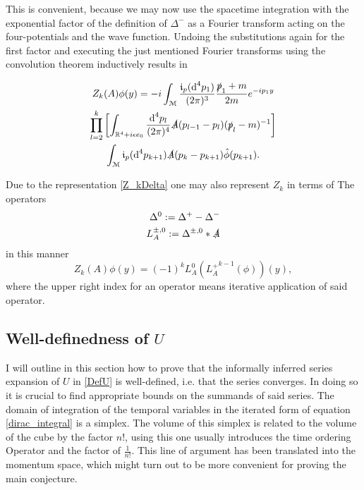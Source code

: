 \documentclass[b5paper,draft,openbib,12pt]{memoir}
\begin{document}
 This is convenient, because we may now use the spacetime
integration with the exponential factor of the definition of \(\Delta^-\) as a Fourier transform
acting on the four-potentials and the wave function. 
Undoing the substitutions again for the first factor and executing the just mentioned Fourier
transforms using the convolution theorem inductively results in

\begin{multline}\label{explicit_Zk}
Z_k(A)\phi(y) =- i  \int_{\mathcal{M}}\frac{\mathfrak{i}_p(\text{d}^4p_1)}{(2\pi)^{3}} \frac{\slashed{p}_1+m}{2m} e^{-ip_1y}  \\
  \prod_{l=2}^{k} \left[ \int_{\mathbb{R}^4+i \epsilon e_0}\frac{\text{d}^4p_l}{(2\pi)^{4}} \slashed{A}(p_{l-1}-p_l)  (\slashed{p}_l-m)^{-1}  
 \right]\\
 \int_{\mathcal{M}}  \mathfrak{i}_p(\text{d}^4p_{k+1})\slashed{A}(p_{k}-p_{k+1})\hat{\phi}(p_{k+1}).
\end{multline}

Due to the representation \eqref{Z_kDelta} one may also represent \(Z_k\) in terms of The operators
\begin{align}
\Delta^0:= \Delta^+-\Delta^-\\
L_A^{\pm,0}:= \Delta^{\pm,0} \ast \slashed{A}
\end{align}
in this manner
\begin{equation}
Z_k(A)\phi(y)= (-1)^{k} L^0_A \left({L_A^+}^{k-1}( \phi)\right) (y),
\end{equation}
where the upper right index for an operator means iterative application of said operator.

\subsection{Well-definedness of \(U\) }\label{sec:well-def}

I will outline in this section how to prove that the informally inferred series
expansion of \(U\) in \eqref{DefU} is well-defined, i.e. that the series
 converges. In doing so it is crucial to find appropriate bounds
on the summands of said series. 
The domain of integration of the temporal variables in the iterated form of
equation \eqref{dirac_integral} is a simplex. The volume of this simplex is
related to the volume of the cube by the factor \(n!\), using this one usually
introduces the time ordering Operator and the factor of \(\frac{1}{n!}\). This
line of argument has been translated into the momentum space, which might turn
out to be more convenient for proving the main conjecture. 
\end{document}
